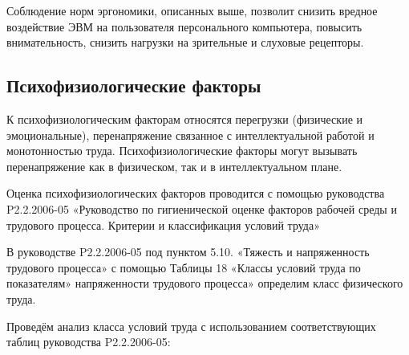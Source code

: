 Соблюдение норм эргономики, описанных выше, позволит снизить вредное воздействие ЭВМ на пользователя персонального компьютера, повысить внимательность, снизить наг\-рузки на зрительные и слуховые рецепторы.

\subsection{Психофизиологические факторы}

К психофизиологическим факторам относятся перегрузки (физические и эмоциональ\-ные), перенапряжение связанное с интеллектуальной работой и монотонностью труда. Психофи\-зиологические факторы могут вызывать перенапряжение как в физическом, так и в интел\-лектуальном плане.

Оценка психофизиологических факторов проводится с помощью руководства P2.2.2006-05 «Руководство по гигиенической оценке факторов рабочей среды и трудового процесса. Критерии и классификация условий труда»

В руководстве P2.2.2006-05 под пунктом 5.10. «Тяжесть и напряженность трудового процесса» с помощью Таблицы 18 «Классы условий труда по показателям» напряженности трудового процесса» определим класс физического труда.

Проведём анализ класса условий труда с использованием соответствующих таблиц руководства P2.2.2006-05:

